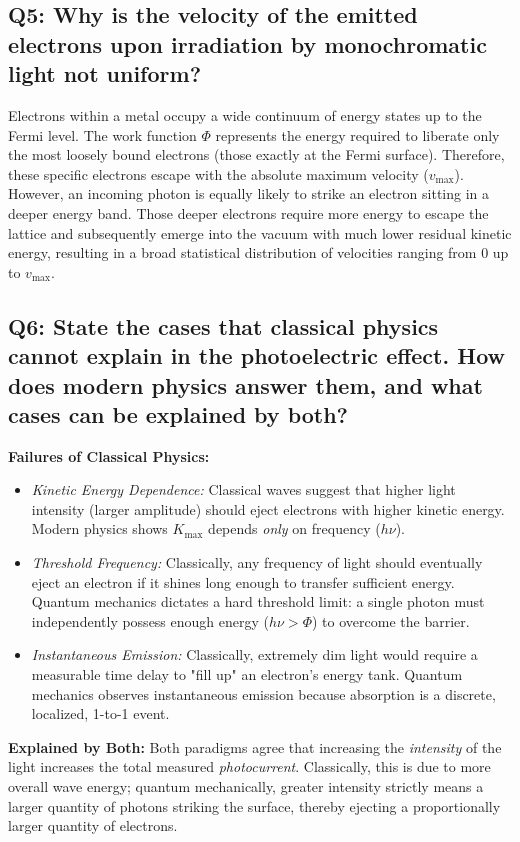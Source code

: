 \documentclass[a4paper,11pt]{article}
\begin{document}
\subsection*{Q5: Why is the velocity of the emitted electrons upon irradiation by monochromatic light not uniform?}
Electrons within a metal occupy a wide continuum of energy states up to the Fermi level. The work function $\Phi$ represents the energy required to liberate only the most loosely bound electrons (those exactly at the Fermi surface). Therefore, these specific electrons escape with the absolute maximum velocity ($v_{\text{max}}$). However, an incoming photon is equally likely to strike an electron sitting in a deeper energy band. Those deeper electrons require more energy to escape the lattice and subsequently emerge into the vacuum with much lower residual kinetic energy, resulting in a broad statistical distribution of velocities ranging from $0$ up to $v_{\text{max}}$.

\subsection*{Q6: State the cases that classical physics cannot explain in the photoelectric effect. How does modern physics answer them, and what cases can be explained by both?}
\textbf{Failures of Classical Physics:}
\begin{itemize}
    \item \textit{Kinetic Energy Dependence:} Classical waves suggest that higher light intensity (larger amplitude) should eject electrons with higher kinetic energy. Modern physics shows $K_{\text{max}}$ depends \textit{only} on frequency ($h\nu$).
    \item \textit{Threshold Frequency:} Classically, any frequency of light should eventually eject an electron if it shines long enough to transfer sufficient energy. Quantum mechanics dictates a hard threshold limit: a single photon must independently possess enough energy ($h\nu > \Phi$) to overcome the barrier.
    \item \textit{Instantaneous Emission:} Classically, extremely dim light would require a measurable time delay to "fill up" an electron's energy tank. Quantum mechanics observes instantaneous emission because absorption is a discrete, localized, 1-to-1 event.
\end{itemize}
\textbf{Explained by Both:}
Both paradigms agree that increasing the \textit{intensity} of the light increases the total measured \textit{photocurrent}. Classically, this is due to more overall wave energy; quantum mechanically, greater intensity strictly means a larger quantity of photons striking the surface, thereby ejecting a proportionally larger quantity of electrons.
\end{document}
